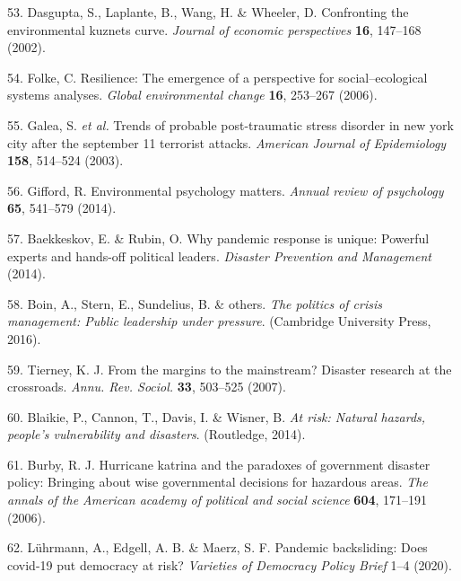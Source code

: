 \documentclass[]{article}
\begin{document}
\begin{cslreferences}
\leavevmode\hypertarget{ref-dasgupta2002confronting}{}%
53. Dasgupta, S., Laplante, B., Wang, H. \& Wheeler, D. Confronting the environmental kuznets curve. \emph{Journal of economic perspectives} \textbf{16}, 147--168 (2002).

\leavevmode\hypertarget{ref-folke2006resilience}{}%
54. Folke, C. Resilience: The emergence of a perspective for social--ecological systems analyses. \emph{Global environmental change} \textbf{16}, 253--267 (2006).

\leavevmode\hypertarget{ref-galea2003trends}{}%
55. Galea, S. \emph{et al.} Trends of probable post-traumatic stress disorder in new york city after the september 11 terrorist attacks. \emph{American Journal of Epidemiology} \textbf{158}, 514--524 (2003).

\leavevmode\hypertarget{ref-gifford2014environmental}{}%
56. Gifford, R. Environmental psychology matters. \emph{Annual review of psychology} \textbf{65}, 541--579 (2014).

\leavevmode\hypertarget{ref-baekkeskov2014pandemic}{}%
57. Baekkeskov, E. \& Rubin, O. Why pandemic response is unique: Powerful experts and hands-off political leaders. \emph{Disaster Prevention and Management} (2014).

\leavevmode\hypertarget{ref-boin2016politics}{}%
58. Boin, A., Stern, E., Sundelius, B. \& others. \emph{The politics of crisis management: Public leadership under pressure}. (Cambridge University Press, 2016).

\leavevmode\hypertarget{ref-tierney2007margins}{}%
59. Tierney, K. J. From the margins to the mainstream? Disaster research at the crossroads. \emph{Annu. Rev. Sociol.} \textbf{33}, 503--525 (2007).

\leavevmode\hypertarget{ref-blaikie2014risk}{}%
60. Blaikie, P., Cannon, T., Davis, I. \& Wisner, B. \emph{At risk: Natural hazards, people's vulnerability and disasters}. (Routledge, 2014).

\leavevmode\hypertarget{ref-burby2006hurricane}{}%
61. Burby, R. J. Hurricane katrina and the paradoxes of government disaster policy: Bringing about wise governmental decisions for hazardous areas. \emph{The annals of the American academy of political and social science} \textbf{604}, 171--191 (2006).

\leavevmode\hypertarget{ref-luhrmann2020}{}%
62. Lührmann, A., Edgell, A. B. \& Maerz, S. F. Pandemic backsliding: Does covid-19 put democracy at risk? \emph{Varieties of Democracy Policy Brief} 1--4 (2020).


\end{cslreferences}
\end{document}
